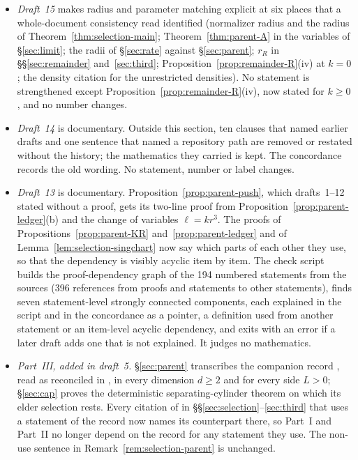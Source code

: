 \begin{itemize}[leftmargin=1.5em,itemsep=2pt]
\item \emph{Draft~15} makes radius and parameter matching explicit at six places that a whole-document consistency read identified (normalizer radius and the radius of Theorem~\ref{thm:selection-main}; Theorem~\ref{thm:parent-A} in the variables of \S\ref{sec:limit}; the radii of \S\ref{sec:rate} against \S\ref{sec:parent}; $r_R$ in \S\S\ref{sec:remainder} and~\ref{sec:third}; Proposition~\ref{prop:remainder-R}(iv) at $k=0$; the density citation for the unrestricted densities). No statement is strengthened except Proposition~\ref{prop:remainder-R}(iv), now stated for $k\ge0$, and no number changes.
\item \emph{Draft~14} is documentary. Outside this section, ten clauses that named earlier drafts and one sentence that named a repository path are removed or restated without the history; the mathematics they carried is kept. The concordance records the old wording. No statement, number or label changes.
\item \emph{Draft~13} is documentary. Proposition~\ref{prop:parent-push}, which drafts~1--12 stated without a proof, gets its two-line proof from Proposition~\ref{prop:parent-ledger}(b) and the change of variables $\ell=kr^3$. The proofs of Propositions~\ref{prop:parent-KR} and~\ref{prop:parent-ledger} and of Lemma~\ref{lem:selection-singchart} now say which parts of each other they use, so that the dependency is visibly acyclic item by item. The check script  builds the proof-dependency graph of the 194 numbered statements from the sources (396 references from proofs and statements to other statements), finds seven statement-level strongly connected components, each explained in the script and in the concordance as a pointer, a definition used from another statement or an item-level acyclic dependency, and exits with an error if a later draft adds one that is not explained. It judges no mathematics.
\item \emph{Part~III, added in draft~5.} \S\ref{sec:parent} transcribes the companion record \cite{parentP}, read as reconciled in \cite{parentREC}, in every dimension $d\ge2$ and for every side $L>0$; \S\ref{sec:cap} proves the deterministic separating-cylinder theorem on which its elder selection rests. Every citation of \cite{parentP} in \S\S\ref{sec:selection}--\ref{sec:third} that uses a statement of the record now names its counterpart there, so Part~I and Part~II no longer depend on the record for any statement they use. The non-use sentence in Remark~\ref{rem:selection-parent} is unchanged.

\end{itemize}
